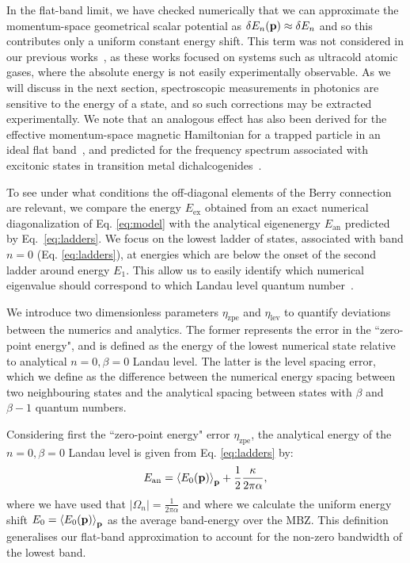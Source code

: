 In the flat-band limit, we have checked numerically that we can approximate the momentum-space geometrical scalar potential as $\delta E_n(\mathbf{p}) \approx   \delta E_n$ and so this contributes only a uniform constant energy shift. This term was not considered in our previous works~\cite{price2014magnetic, ozawa2014momhh}, as these works focused on systems such as ultracold atomic gases, where the absolute energy is not easily experimentally observable. As we will discuss in the next section, spectroscopic measurements in photonics are sensitive to the energy of a state, and so such corrections may be extracted experimentally. We note that an analogous effect has also been derived for the effective momentum-space magnetic Hamiltonian for a trapped particle in an ideal flat band~\cite{Claassen_prl_2015}, and predicted for the frequency spectrum associated with excitonic states in transition metal dichalcogenides~\cite{srivastava:2015}.

To see under what conditions the off-diagonal elements of the Berry connection are relevant, we compare the energy $E_{\text{ex}}$ obtained from an exact numerical diagonalization of Eq. \ref{eq:model} with the analytical eigenenergy $  E_{\text{an}}$ predicted by Eq.~\eqref{eq:ladders}. We focus on the lowest ladder of states, associated with band $n=0$ (Eq. \ref{eq:ladders}), at energies which are below the onset of the second ladder around energy $E_1$. This allow us to easily identify which numerical eigenvalue should correspond to which Landau level quantum number~\cite{price2014magnetic}. 

We introduce two dimensionless parameters $\eta_{\text{zpe}}$ and $\eta_{\text{lev}}$ to quantify deviations between the numerics and analytics. The former represents the error in the ``zero-point energy", and is defined as the energy of the lowest numerical state relative to analytical $n=0, \beta=0$ Landau level. The latter is the level spacing error, which we define as the difference between the numerical energy spacing between two neighbouring states and the analytical spacing between states with $\beta$ and $\beta-1$ quantum numbers.  

Considering first the ``zero-point energy" error $\eta_{\text{zpe}}$, the analytical energy of the $n=0, \beta=0$ Landau level is given from Eq. \ref{eq:ladders} by:
%
\begin{equation}
  E_{\text{an}} = \left<E_0(\mathbf{p})\right>_{\mathbf{p}} + \frac{1}{2}\frac{\kappa}{2\pi\alpha} ,
\end{equation}
%
where we have used that $|\Omega_n| = \frac{1}{2\pi\alpha}$ and where we calculate the uniform energy shift $E_0=\left<E_0(\mathbf{p})\right>_{\mathbf{p}}$ as the average band-energy over the MBZ. This definition generalises our flat-band approximation to account for the non-zero bandwidth of the lowest band. 

